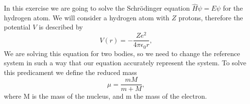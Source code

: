 \begin{questions}

\begin{solution}
  In this exercise we are going to solve the Schrödinger equation $\hat{H}\psi = E \psi$ for the hydrogen atom. We will consider a hydrogen atom with $Z$ protons, therefore the potential $V$ is described by
  \begin{equation}
    V(r) = -\frac{Ze^2}{4\pi \epsilon_0 r},
    \label{hy:v}
  \end{equation}
  We are solving this equation for two bodies, so we need to change the reference system in such a way that our equation accurately represent the system. To solve this predicament we define the reduced mass
  \begin{equation}
    \mu = \frac{mM}{m+M},
    \label{red:mass}
  \end{equation}
  where M is the mass of the nucleus, and m the mass of the electron.


\end{solution}
\end{questions}
